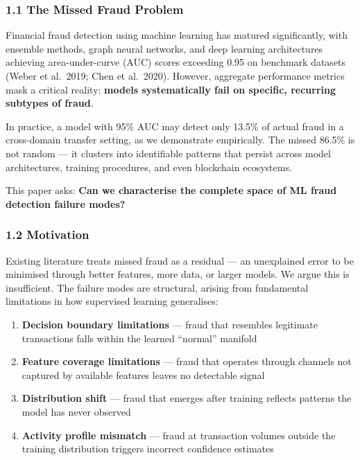 \documentclass[
  11pt,
]{article}
\providecommand{\tightlist}{%
  \setlength{\itemsep}{0pt}\setlength{\parskip}{0pt}}
\begin{document}
\subsubsection{1.1 The Missed Fraud
Problem}\label{the-missed-fraud-problem}

Financial fraud detection using machine learning has matured
significantly, with ensemble methods, graph neural networks, and deep
learning architectures achieving area-under-curve (AUC) scores exceeding
0.95 on benchmark datasets (Weber et al.~2019; Chen et al.~2020).
However, aggregate performance metrics mask a critical reality:
\textbf{models systematically fail on specific, recurring subtypes of
fraud}.

In practice, a model with 95\% AUC may detect only 13.5\% of actual
fraud in a cross-domain transfer setting, as we demonstrate empirically.
The missed 86.5\% is not random — it clusters into identifiable patterns
that persist across model architectures, training procedures, and even
blockchain ecosystems.

This paper asks: \textbf{Can we characterise the complete space of ML
fraud detection failure modes?}

\subsubsection{1.2 Motivation}\label{motivation}

Existing literature treats missed fraud as a residual — an unexplained
error to be minimised through better features, more data, or larger
models. We argue this is insufficient. The failure modes are structural,
arising from fundamental limitations in how supervised learning
generalises:

\begin{enumerate}
\def\labelenumi{\arabic{enumi}.}
\tightlist
\item
  \textbf{Decision boundary limitations} — fraud that resembles
  legitimate transactions falls within the learned “normal” manifold
\item
  \textbf{Feature coverage limitations} — fraud that operates through
  channels not captured by available features leaves no detectable
  signal
\item
  \textbf{Distribution shift} — fraud that emerges after training
  reflects patterns the model has never observed
\item
  \textbf{Activity profile mismatch} — fraud at transaction volumes
  outside the training distribution triggers incorrect confidence
  estimates
\end{enumerate}
\end{document}
